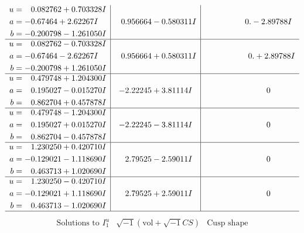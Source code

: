 \documentclass[1p]{elsarticle_modified}
\theoremstyle{definition}
\newcommand{\I}{\sqrt{-1}}
\begin{document}
$$\begin{array}{c|c|c}
\begin{aligned}
u &= \phantom{-}0.082762 + 0.703328 I \\
a &= -0.67464 + 2.62267 I \\
b &= -0.200798 - 1.261050 I\end{aligned}
 & \phantom{-}0.956664 - 0.580311 I & \phantom{-0.000000 } 0. - 2.89788 I \\ \hline\begin{aligned}
u &= \phantom{-}0.082762 - 0.703328 I \\
a &= -0.67464 - 2.62267 I \\
b &= -0.200798 + 1.261050 I\end{aligned}
 & \phantom{-}0.956664 + 0.580311 I & \phantom{-0.000000 -}0. + 2.89788 I \\ \hline\begin{aligned}
u &= \phantom{-}0.479748 + 1.204300 I \\
a &= \phantom{-}0.195027 - 0.015270 I \\
b &= \phantom{-}0.862704 + 0.457878 I\end{aligned}
 & -2.22245 + 3.81114 I & \phantom{-0.000000 } 0 \\ \hline\begin{aligned}
u &= \phantom{-}0.479748 - 1.204300 I \\
a &= \phantom{-}0.195027 + 0.015270 I \\
b &= \phantom{-}0.862704 - 0.457878 I\end{aligned}
 & -2.22245 - 3.81114 I & \phantom{-0.000000 } 0 \\ \hline\begin{aligned}
u &= \phantom{-}1.230250 + 0.420710 I \\
a &= -0.129021 - 1.118690 I \\
b &= \phantom{-}0.463713 + 1.020690 I\end{aligned}
 & \phantom{-}2.79525 - 2.59011 I & \phantom{-0.000000 } 0 \\ \hline\begin{aligned}
u &= \phantom{-}1.230250 - 0.420710 I \\
a &= -0.129021 + 1.118690 I \\
b &= \phantom{-}0.463713 - 1.020690 I\end{aligned}
 & \phantom{-}2.79525 + 2.59011 I & \phantom{-0.000000 } 0\\
 \hline 
 \end{array}$$\newpage$$\begin{array}{c|c|c}  
\text{Solutions to }I^u_{1}& \I (\text{vol} + \sqrt{-1}CS) & \text{Cusp shape}\\

\end{array}$$
\end{document}
